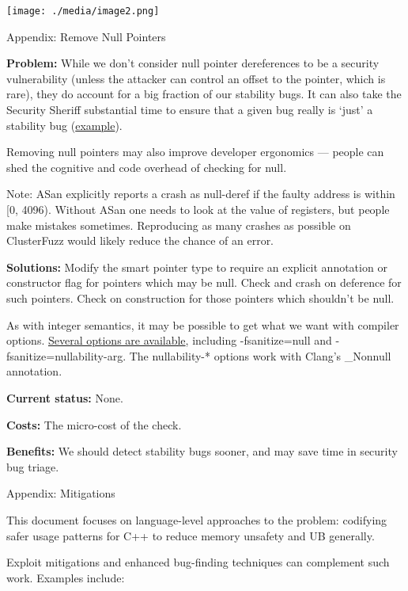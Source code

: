 \documentclass[a4paper,12pt,notitlepage,twoside,openright]{article}
\begin{document}
{\texttt{[image: ./media/image2.png]}

Appendix: Remove Null Pointers

\textbf{Problem:} While we don't consider null pointer dereferences to
be a security vulnerability (unless the attacker can control an offset
to the pointer, which is rare), they do account for a big fraction of
our stability bugs. It can also take the Security Sheriff substantial
time to ensure that a given bug really is `just' a stability bug
(\href{https://www.google.com/url?q=https://bugs.chromium.org/p/chromium/issues/detail?id\%3D1048473\&sa=D\&source=editors\&ust=1631944129122000\&usg=AOvVaw0fy7uPuy7ezmAwq9hPlixp}{example}).

Removing null pointers may also improve developer ergonomics --- people
can shed the cognitive and code overhead of checking for null.

Note: ASan explicitly reports a crash as null-deref if the faulty
address is within {[}0, 4096). Without ASan one needs to look at the
value of registers, but people make mistakes sometimes. Reproducing as
many crashes as possible on ClusterFuzz would likely reduce the chance
of an error.

\textbf{Solutions:} Modify the smart pointer type to require an explicit
annotation or constructor flag for pointers which may be null. Check and
crash on deference for such pointers. Check on construction for those
pointers which shouldn't be null.

As with integer semantics, it may be possible to get what we want with
compiler
options. \href{https://www.google.com/url?q=https://clang.llvm.org/docs/UndefinedBehaviorSanitizer.html\&sa=D\&source=editors\&ust=1631944129123000\&usg=AOvVaw3Y79vEDZKr7fj2vr_YqYy3}{Several
options are available},
including -fsanitize=null and -fsanitize=nullability-arg.
The nullability-* options work with Clang's \_Nonnull annotation.

\textbf{Current status:} None.

\textbf{Costs:} The micro-cost of the check.

\textbf{Benefits:} We should detect stability bugs sooner, and may save
time in security bug triage.

Appendix: Mitigations

This document focuses on language-level approaches to the problem:
codifying safer usage patterns for C++ to reduce memory unsafety and UB
generally.

Exploit mitigations and enhanced bug-finding techniques can complement
such work. Examples include:

}
\end{document}
